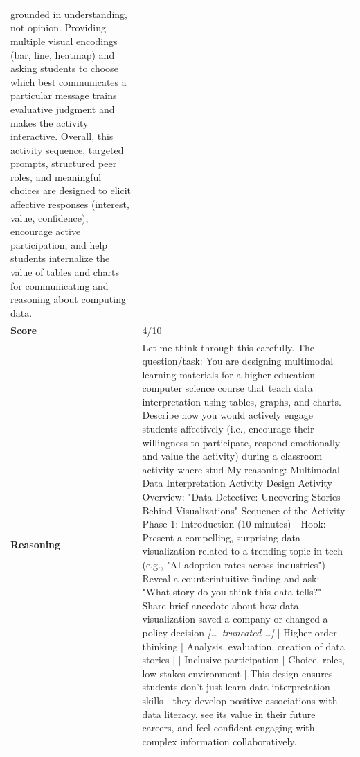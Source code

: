 \begin{longtable}{@{}l p{13cm}@{}}
grounded in understanding, not opinion. Providing multiple visual encodings (bar, line, heatmap) and asking students to choose which best communicates a particular message trains evaluative judgment and makes the activity interactive. \newline Overall, this activity sequence, targeted prompts, structured peer roles, and meaningful choices are designed to elicit affective responses (interest, value, confidence), encourage active participation, and help students internalize the value of tables and charts for communicating and reasoning about computing data.      \\
  \textbf{Score}     & 4/10  \\
  \textbf{Reasoning} & Let me think through this carefully. \newline The question/task: You are designing multimodal learning materials for a higher-education computer science course that teach data interpretation using tables, graphs, and charts. Describe how you would actively engage students affectively (i.e., encourage their willingness to participate, respond emotionally and value the activity) during a classroom activity where stud \newline My reasoning: Multimodal Data Interpretation Activity Design \newline Activity Overview: "Data Detective: Uncovering Stories Behind Visualizations" \newline Sequence of the Activity \newline Phase 1: Introduction (10 minutes) \newline - Hook: Present a compelling, surprising data visualization related to a trending topic in tech (e.g., "AI adoption rates across industries") \newline - Reveal a counterintuitive finding and ask: "What story do you think this data tells?" \newline - Share brief anecdote about how data visualization saved a company or changed a policy decision \newline \textit{[\ldots\ truncated \ldots]} \newline | Higher-order thinking | Analysis, evaluation, creation of data stories | \newline | Inclusive participation | Choice, roles, low-stakes environment | \newline This design ensures students don't just learn data interpretation skills---they develop positive associations with data literacy, see its value in their future careers, and feel confident engaging with complex information collaboratively.  \\

\end{longtable}
